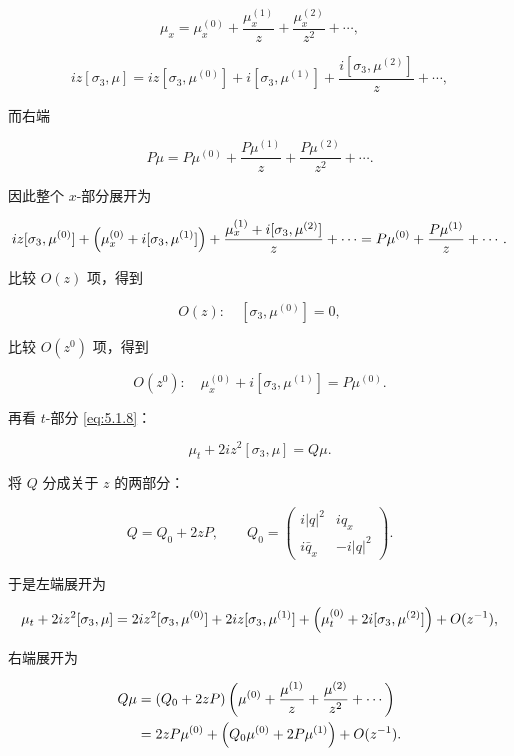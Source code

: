 \documentclass[
    lang=cn,
    scheme=chinese,
    mode=simple,
    device=normal,
    color=blue,
    math=cm,
    thmcnt=section,
    12pt,
    nowatermark
]{elegantbook}
\begin{document}
\[
    \mu_x
    =
    \mu_x^{(0)}
    +\dfrac{\mu_x^{(1)}}{z}
    +\dfrac{\mu_x^{(2)}}{z^2}
    +\cdots,
\]

\[
    iz[\sigma_3,\mu]
    =
    iz[\sigma_3,\mu^{(0)}]
    +i[\sigma_3,\mu^{(1)}]
    +\dfrac{i[\sigma_3,\mu^{(2)}]}{z}
    +\cdots,
\]

而右端

\[
    P\mu
    =
    P\mu^{(0)}
    +\dfrac{P\mu^{(1)}}{z}
    +\dfrac{P\mu^{(2)}}{z^2}
    +\cdots.
\]

因此整个 $x$-部分展开为

\[
    iz[\sigma_3,\mu^{(0)}]
    +\Bigl(\mu_x^{(0)}+i[\sigma_3,\mu^{(1)}]\Bigr)
    +\dfrac{\mu_x^{(1)}+i[\sigma_3,\mu^{(2)}]}{z}
    +\cdots
    =
    P\mu^{(0)}
    +\dfrac{P\mu^{(1)}}{z}
    +\cdots.
\]

比较 $O(z)$ 项，得到

\begin{equation}
    O(z):\quad[\sigma_3,\mu^{(0)}]=0,
    \tag{5.1.11}
    \label{eq:5.1.11}
\end{equation}

比较 $O(z^0)$ 项，得到

\begin{equation}
    O(z^0):\quad\mu_x^{(0)}+i[\sigma_3,\mu^{(1)}]=P\mu^{(0)}.
    \tag{5.1.12}
    \label{eq:5.1.12}
\end{equation}

再看 $t$-部分 \eqref{eq:5.1.8}：

\[
    \mu_t+2iz^2[\sigma_3,\mu]=Q\mu.
\]

将 $Q$ 分成关于 $z$ 的两部分：

\[
    Q=Q_0+2zP,
    \qquad
    Q_0=
    \begin{pmatrix}
        i\lvert q\rvert^2 & iq_x \\
        i\bar q_x          & -i\lvert q\rvert^2
    \end{pmatrix}.
\]

于是左端展开为

\[
    \mu_t+2iz^2[\sigma_3,\mu]
    =
    2iz^2[\sigma_3,\mu^{(0)}]
    +2iz[\sigma_3,\mu^{(1)}]
    +\Bigl(\mu_t^{(0)}+2i[\sigma_3,\mu^{(2)}]\Bigr)
    +O(z^{-1}),
\]

右端展开为

\[
    \begin{aligned}
        Q\mu
        &=(Q_0+2zP)
        \left(
            \mu^{(0)}+\dfrac{\mu^{(1)}}{z}+\dfrac{\mu^{(2)}}{z^2}+\cdots
        \right)\\
        &=2zP\mu^{(0)}
        +\Bigl(Q_0\mu^{(0)}+2P\mu^{(1)}\Bigr)
        +O(z^{-1}).
    \end{aligned}
\]
\end{document}
